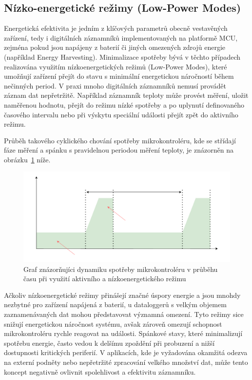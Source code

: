 \subsection{Nízko-energetické režimy (Low-Power Modes)}
\label{nizko_energeticke_rezimy}
Energetická efektivita je jedním z klíčových parametrů obecně vestavěných zařízení, tedy i digitálních záznamníků implementovaných na platformě MCU, zejména pokud jsou napájeny z baterií či jiných omezených zdrojů energie (například Energy Harvesting). Minimalizace spotřeby bývá v těchto případech realizována využitím nízkoenergetických režimů (Low-Power Modes), které umožňují zařízení přejít do stavu s minimální energetickou náročností během nečinných period. V praxi mnoho digitálních záznamníků nemusí provádět záznam dat nepřetržitě. Například záznamník teploty může provést měření, uložit naměřenou hodnotu, přejít do režimu nízké spotřeby a po uplynutí definovaného časového intervalu nebo při výskytu speciální události přejít zpět do aktivního režimu. \cite{analog_devices_low_power_modes}

Průběh takového cyklického chování spotřeby mikrokontroléru, kde se střídají fáze měření a spánku s pravidelnou periodou měření teploty, je znázorněn na obrázku~\ref{fig:low-power-modes} níže.

\begin{figure}[h]
    \centering
    \includegraphics[width=1.00\textwidth]{obrazky-figures/low_power_modes-cz.pdf}
    
    \caption{Graf znázorňujíci dynamiku spotřeby mikrokontroléru v průběhu času při využití aktivního a nízkoenergetického režimu}
    \label{fig:low-power-modes}
\end{figure}

Ačkoliv nízkoenergetické režimy přinášejí značné úspory energie a jsou mnohdy nezbytné pro zařízení napájená z baterií, u dataloggerů s velkým objemem zaznamenávaných dat mohou představovat významná omezení. Tyto režimy sice snižují energetickou náročnost systému, avšak zároveň omezují schopnost mikrokontroléru rychle reagovat na události. Spánkové stavy, které minimalizují spotřebu energie, často vedou k delšímu zpoždění při probuzení a nižší dostupnosti kritických periferií. V aplikacích, kde je vyžadována okamžitá odezva na externí podněty nebo nepřetržité zpracování velkého množství dat, může tento koncept negativně ovlivnit spolehlivost a efektivitu záznamníku. \cite{embedded_low_power_modes}

